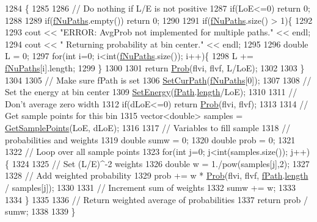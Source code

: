 \begin{DoxyCode}
1284 \{
1285 
1286   \textcolor{comment}{// Do nothing if L/E is not positive}
1287   \textcolor{keywordflow}{if}(LoE<=0) \textcolor{keywordflow}{return} 0;
1288 
1289   \textcolor{keywordflow}{if}(\hyperlink{classOscProb_1_1PMNS__Base_a69db9d57e12fc7cbe0431bc6c18fac93}{fNuPaths}.empty()) \textcolor{keywordflow}{return} 0;
1290 
1291   \textcolor{keywordflow}{if}(\hyperlink{classOscProb_1_1PMNS__Base_a69db9d57e12fc7cbe0431bc6c18fac93}{fNuPaths}.size() > 1)\{
1292 
1293     cout << \textcolor{stringliteral}{"ERROR: AvgProb not implemented for multiple paths."} << endl;
1294     cout << \textcolor{stringliteral}{"       Returning probability at bin center."} << endl;
1295 
1296     \textcolor{keywordtype}{double} L = 0;
1297     \textcolor{keywordflow}{for}(\textcolor{keywordtype}{int} i=0; i<int(\hyperlink{classOscProb_1_1PMNS__Base_a69db9d57e12fc7cbe0431bc6c18fac93}{fNuPaths}.size()); i++)\{
1298       L += \hyperlink{classOscProb_1_1PMNS__Base_a69db9d57e12fc7cbe0431bc6c18fac93}{fNuPaths}[i].length;
1299     \}
1300 
1301     \textcolor{keywordflow}{return} \hyperlink{classOscProb_1_1PMNS__Base_aec5c399b93261f1962a4b7dbbb44b973}{Prob}(flvi, flvf, L/LoE);
1302 
1303   \}
1304 
1305   \textcolor{comment}{// Make sure fPath is set}
1306   \hyperlink{classOscProb_1_1PMNS__Base_a986e6ebef09a7e2eb7fee16a4c2c834d}{SetCurPath}(\hyperlink{classOscProb_1_1PMNS__Base_a69db9d57e12fc7cbe0431bc6c18fac93}{fNuPaths}[0]);
1307 
1308   \textcolor{comment}{// Set the energy at bin center}
1309   \hyperlink{classOscProb_1_1PMNS__Base_a95b3b0d0cab5e6a54b5ef99587f837c0}{SetEnergy}(\hyperlink{classOscProb_1_1PMNS__Base_a849437aa8891fe042e86886ce8f81c6e}{fPath}.\hyperlink{structOscProb_1_1NuPath_af22660894b6e25cf835500381b155557}{length}/LoE);
1310 
1311   \textcolor{comment}{// Don't average zero width}
1312   \textcolor{keywordflow}{if}(dLoE<=0) \textcolor{keywordflow}{return} \hyperlink{classOscProb_1_1PMNS__Base_aec5c399b93261f1962a4b7dbbb44b973}{Prob}(flvi, flvf);
1313 
1314   \textcolor{comment}{// Get sample points for this bin}
1315   vector<double> samples = \hyperlink{classOscProb_1_1PMNS__Base_a9eac8d768c1424755ee41f7e783af179}{GetSamplePoints}(LoE, dLoE);
1316 
1317   \textcolor{comment}{// Variables to fill sample}
1318   \textcolor{comment}{// probabilities and weights}
1319   \textcolor{keywordtype}{double} sumw = 0;
1320   \textcolor{keywordtype}{double} prob = 0;
1321 
1322   \textcolor{comment}{// Loop over all sample points}
1323   \textcolor{keywordflow}{for}(\textcolor{keywordtype}{int} j=0; j<int(samples.size()); j++)\{
1324 
1325     \textcolor{comment}{// Set (L/E)^-2 weights}
1326     \textcolor{keywordtype}{double} w = 1./pow(samples[j],2);
1327 
1328     \textcolor{comment}{// Add weighted probability}
1329     prob += w * \hyperlink{classOscProb_1_1PMNS__Base_aec5c399b93261f1962a4b7dbbb44b973}{Prob}(flvi, flvf, \hyperlink{classOscProb_1_1PMNS__Base_a849437aa8891fe042e86886ce8f81c6e}{fPath}.\hyperlink{structOscProb_1_1NuPath_af22660894b6e25cf835500381b155557}{length} / samples[j]);
1330 
1331     \textcolor{comment}{// Increment sum of weights}
1332     sumw += w;
1333 
1334   \}
1335 
1336   \textcolor{comment}{// Return weighted average of probabilities}
1337   \textcolor{keywordflow}{return} prob / sumw;
1338 
1339 \}
\end{DoxyCode}
